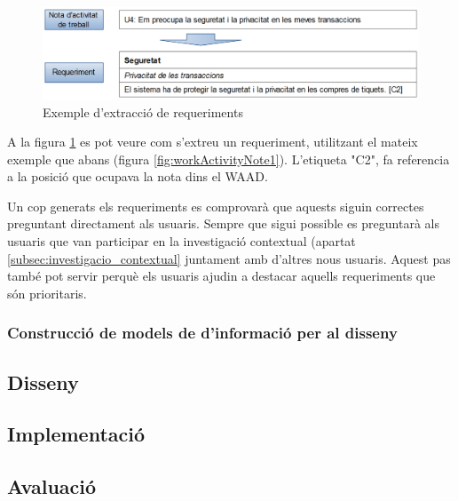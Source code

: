 \begin{figure}[htp]
\centering
\includegraphics[scale=0.3]{WorkActivityNotes2.png}
\caption{Exemple d'extracció de requeriments}\label{fig:workActivityNote2}
\end{figure}

A la figura \ref{fig:workActivityNote2} es pot veure com s'extreu un requeriment, utilitzant el mateix exemple que abans (figura \ref{fig:workActivityNote1}). L'etiqueta "C2", fa referencia a la posició que ocupava la nota dins el \ac{WAAD}.

Un cop generats els requeriments es comprovarà que aquests siguin correctes preguntant directament als usuaris. Sempre que sigui possible es preguntarà als usuaris que van participar en la investigació contextual (apartat \ref{subsec:investigacio_contextual} juntament amb d'altres nous usuaris. Aquest pas també pot servir perquè els usuaris ajudin a destacar aquells requeriments que són prioritaris.

\subsubsection{Construcció de models de d'informació per al disseny}


\subsection{Disseny}

\subsection{Implementació}
\subsection{Avaluació}